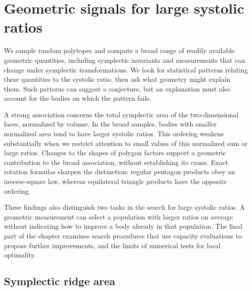 \section{Geometric signals for large systolic ratios}
\label{sec:fresh-data-search}
\label{sec:black-box-datascience}

We sample random polytopes and compute a broad range of readily available
geometric quantities, including symplectic invariants and measurements
that can change under symplectic transformations. We look for statistical
patterns relating these quantities to the systolic ratio, then ask what
geometry might explain them. Such patterns can suggest a conjecture, but
an explanation must also account for the bodies on which the pattern fails.

A strong association concerns the total symplectic area of the
two-dimensional faces, normalized by volume. In the broad samples,
bodies with smaller normalized area tend to have larger systolic ratios.
This ordering weakens substantially when we restrict attention to small
values of this normalized sum or large ratios. Changes to the shapes of polygon factors
support a geometric contribution to the broad association, without
establishing its cause. Exact rotation formulas sharpen the distinction:
regular pentagon products obey an inverse-square law, whereas equilateral
triangle products have the opposite ordering.

These findings also distinguish two tasks in the search for large systolic
ratios. A geometric measurement can select a population with larger ratios
on average without indicating how to improve a body already in that
population. The final part of the chapter examines search procedures that
use capacity evaluations to propose further improvements, and the limits
of numerical tests for local optimality.

\subsection{Symplectic ridge area}
\label{subsec:ds-sampling}

